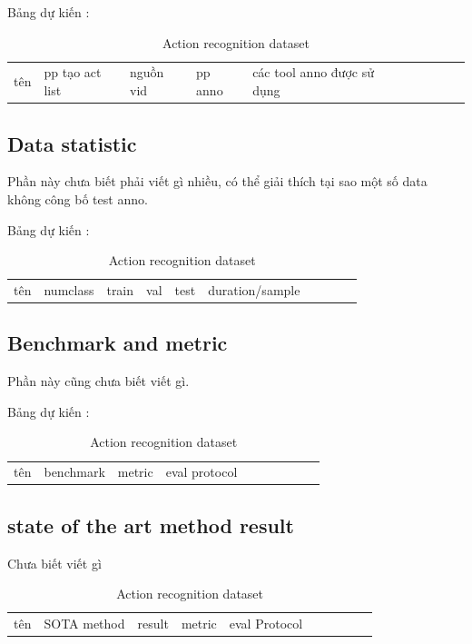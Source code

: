 \documentclass[a4paper]{article}
\begin{document}
Bảng dự kiến : 

\begin{table}[h]
	\centering
	\caption{Action recognition dataset}
	\begin{tabular}{l|l l l l l l l l l}
		\toprule
		tên & pp tạo act list & nguồn vid & pp anno & các tool anno được sử dụng \\
	\end{tabular}%
	\label{config}
\end{table}%

\subsection{Data statistic}

Phần này chưa biết phải viết gì nhiều, có thể giải thích tại sao một số data không công bố test anno.

Bảng dự kiến : 

\begin{table}[h]
	\centering
	\caption{Action recognition dataset}
	\begin{tabular}{l|l l l l l l l l l}
		\toprule
		tên & numclass & train & val & test & duration/sample \\
	\end{tabular}%
	\label{config2}
\end{table}%

\subsection{Benchmark and metric}

Phần này cũng chưa biết viết gì.

Bảng dự kiến : 

\begin{table}[h]
	\centering
	\caption{Action recognition dataset}
	\begin{tabular}{l|l l l l l l l l l}
		\toprule
		tên & benchmark & metric & eval protocol \\
	\end{tabular}%
	\label{config3}
\end{table}%

\subsection{state of the art method result}

Chưa biết viết gì

\begin{table}[h]
	\centering
	\caption{Action recognition dataset}
	\begin{tabular}{l|l l l l l l l l l}
		\toprule
		tên & SOTA method & result & metric & eval Protocol \\
	\end{tabular}%
	\label{config4}
\end{table}%
\end{document}
